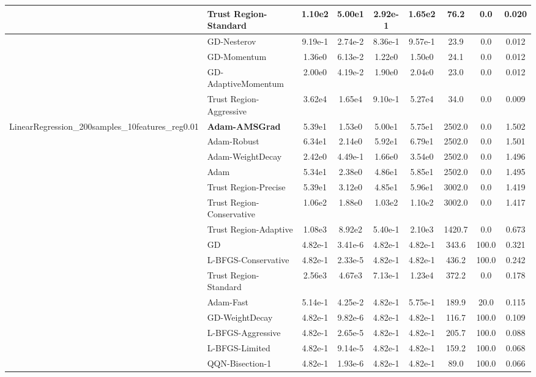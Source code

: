 \documentclass[10pt]{article}
\begin{document}
\begin{longtable}{|l|l|c|c|c|c|c|c|c|}
\hline
 & Trust Region-Standard & 1.10e2 & 5.00e1 & 2.92e-1 & 1.65e2 & 76.2 & 0.0 & 0.020 \\
\hline
 & GD-Nesterov & 9.19e-1 & 2.74e-2 & 8.36e-1 & 9.57e-1 & 23.9 & 0.0 & 0.012 \\
\hline
 & GD-Momentum & 1.36e0 & 6.13e-2 & 1.22e0 & 1.50e0 & 24.1 & 0.0 & 0.012 \\
\hline
 & GD-AdaptiveMomentum & 2.00e0 & 4.19e-2 & 1.90e0 & 2.04e0 & 23.0 & 0.0 & 0.012 \\
\hline
 & Trust Region-Aggressive & 3.62e4 & 1.65e4 & 9.10e-1 & 5.27e4 & 34.0 & 0.0 & 0.009 \\
LinearRegression\_200samples\_10features\_reg0.01 & \textbf{Adam-AMSGrad} & 5.39e1 & 1.53e0 & 5.00e1 & 5.75e1 & 2502.0 & 0.0 & 1.502 \\
\hline
 & Adam-Robust & 6.34e1 & 2.14e0 & 5.92e1 & 6.79e1 & 2502.0 & 0.0 & 1.501 \\
\hline
 & Adam-WeightDecay & 2.42e0 & 4.49e-1 & 1.66e0 & 3.54e0 & 2502.0 & 0.0 & 1.496 \\
\hline
 & Adam & 5.34e1 & 2.38e0 & 4.86e1 & 5.85e1 & 2502.0 & 0.0 & 1.495 \\
\hline
 & Trust Region-Precise & 5.39e1 & 3.12e0 & 4.85e1 & 5.96e1 & 3002.0 & 0.0 & 1.419 \\
\hline
 & Trust Region-Conservative & 1.06e2 & 1.88e0 & 1.03e2 & 1.10e2 & 3002.0 & 0.0 & 1.417 \\
\hline
 & Trust Region-Adaptive & 1.08e3 & 8.92e2 & 5.40e-1 & 2.10e3 & 1420.7 & 0.0 & 0.673 \\
\hline
 & GD & 4.82e-1 & 3.41e-6 & 4.82e-1 & 4.82e-1 & 343.6 & 100.0 & 0.321 \\
\hline
 & L-BFGS-Conservative & 4.82e-1 & 2.33e-5 & 4.82e-1 & 4.82e-1 & 436.2 & 100.0 & 0.242 \\
\hline
 & Trust Region-Standard & 2.56e3 & 4.67e3 & 7.13e-1 & 1.23e4 & 372.2 & 0.0 & 0.178 \\
\hline
 & Adam-Fast & 5.14e-1 & 4.25e-2 & 4.82e-1 & 5.75e-1 & 189.9 & 20.0 & 0.115 \\
\hline
 & GD-WeightDecay & 4.82e-1 & 9.82e-6 & 4.82e-1 & 4.82e-1 & 116.7 & 100.0 & 0.109 \\
\hline
 & L-BFGS-Aggressive & 4.82e-1 & 2.65e-5 & 4.82e-1 & 4.82e-1 & 205.7 & 100.0 & 0.088 \\
\hline
 & L-BFGS-Limited & 4.82e-1 & 9.14e-5 & 4.82e-1 & 4.82e-1 & 159.2 & 100.0 & 0.068 \\
\hline
 & QQN-Bisection-1 & 4.82e-1 & 1.93e-6 & 4.82e-1 & 4.82e-1 & 89.0 & 100.0 & 0.066 \\

\end{longtable}
\end{document}
